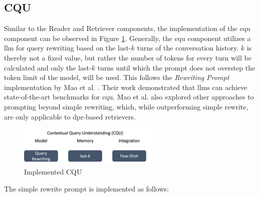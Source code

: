 \subsection{CQU}
\label{subsec:cqu-impl}

Similar to the Reader and Retriever components, the implementation of the \gls{cqu} component can be observed in Figure \ref{fig:cqu-implementation}. Generally, the \gls{cqu} component utilizes a \gls{llm} for query rewriting based on the last-$k$ turns of the conversation history. $k$ is thereby not a fixed value, but rather the number of tokens for every turn will be calculated and only the last-$k$ turns until which the prompt does not overstep the token limit of the model, will be used. This follows the \textit{Rewriting Prompt} implementation by Mao et al. \cite{mao_large_2023}. Their work demonstrated that \gls{llm}s can achieve state-of-the-art benchmarks for \gls{cqu}. Mao et al. also explored other approaches to prompting beyond simple rewriting, which, while outperforming simple rewrite, are only applicable to \gls{dpr}-based retrievers.

\begin{figure}[H]
    \centering
    \includegraphics[width=0.6\textwidth]{Grafiken/CQU_Implementation.png}
    \caption{Implemented CQU}
    \label{fig:cqu-implementation}
\end{figure}

The simple rewrite prompt is implemented as follows:

